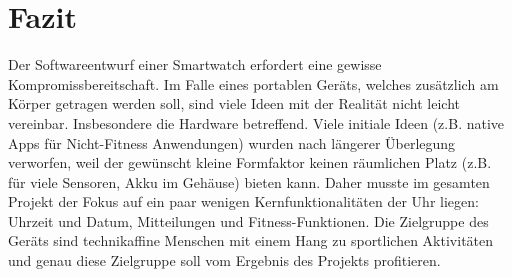 \chapter{Fazit}

Der Softwareentwurf einer Smartwatch erfordert eine gewisse Kompromissbereitschaft. Im Falle eines portablen Geräts, welches zusätzlich am Körper getragen werden soll, sind viele Ideen mit der Realität nicht leicht vereinbar. Insbesondere die Hardware betreffend. Viele initiale Ideen (z.B. native Apps für Nicht-Fitness Anwendungen) wurden nach längerer Überlegung verworfen, weil der gewünscht kleine Formfaktor keinen räumlichen Platz (z.B. für viele Sensoren, Akku im Gehäuse) bieten kann. Daher musste im gesamten Projekt der Fokus auf ein paar wenigen Kernfunktionalitäten der Uhr liegen: Uhrzeit und Datum, Mitteilungen und Fitness-Funktionen. Die Zielgruppe des Geräts sind technikaffine Menschen mit einem Hang zu sportlichen Aktivitäten und genau diese Zielgruppe soll vom Ergebnis des Projekts profitieren.
